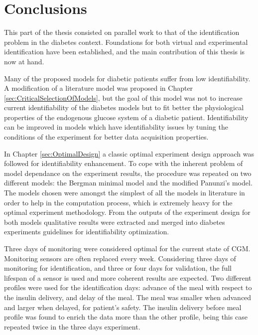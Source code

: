 
\chapter*{Conclusions}
\label{sec:Conclusions_CGM}

This part of the thesis consisted on parallel work to that of the identification problem in the diabetes context. Foundations for both virtual and experimental identification have been established, and the main contribution of this thesis is now at hand.

Many of the proposed models for diabetic patients suffer from low identifiability. A modification of a literature model was proposed in Chapter \ref{sec:CriticalSelectionOfModels}, but the goal of this model was not to increase current identifiability of the diabetes models but to fit better the physiological properties of the endogenous glucose system of a diabetic patient. Identifiability can be improved in models which have identifiability issues by tuning the conditions of the experiment for better data acquisition properties.

In Chapter \ref{sec:OptimalDesign} a classic optimal experiment design approach was followed for identifiability enhancement. To cope with the inherent problem of model dependance on the experiment results, the procedure was repeated on two different models: the Bergman minimal model and the modified Panunzi's model. The models chosen were amongst the simplest of all the models in literature in order to help in the computation process, which is extremely heavy for the optimal experiment methodology. From the outputs of the experiment design for both models qualitative results were extracted and merged into diabetes experiments guidelines for identifiability optimization.

Three days of monitoring were considered optimal for the current state of CGM. Monitoring sensors are often replaced every week. Considering three days of monitoring for identification, and three or four days for validation, the full lifespan of a sensor is used and more coherent results are expected. Two different profiles were used for the identification days: advance of the meal with respect to the insulin delivery, and delay of the meal. The meal was smaller when advanced and larger when delayed, for patient's safety. The insulin delivery before meal profile was found to enrich the data more than the other profile, being this case repeated twice in the three days experiment.

